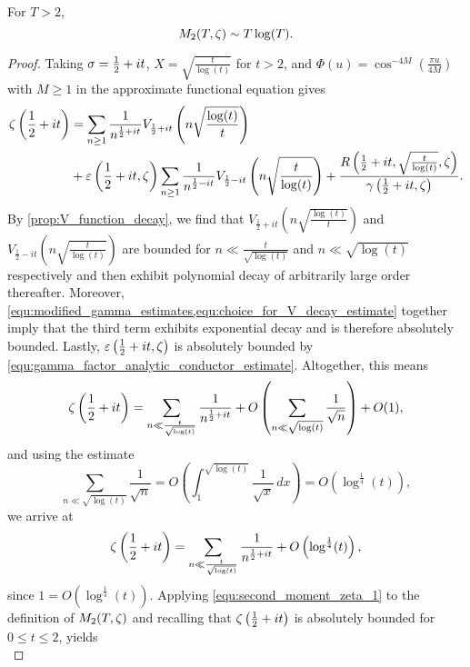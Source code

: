     \begin{theorem}
      For $T > 2$,
      \[
        M_{2}(T,\zeta) \sim T\log(T).
      \]
    \end{theorem}
    \begin{proof}
      Taking $\sigma = \frac{1}{2}+it$, $X = \sqrt{\frac{t}{\log(t)}}$ for $t > 2$, and $\Phi(u) = \cos^{-4M}\left(\frac{\pi u}{4M}\right)$ with $M \ge 1$ in the approximate functional equation gives
      \begin{align*}
        \zeta\left(\frac{1}{2}+it\right) &= \sum_{n \ge 1}\frac{1}{n^{\frac{1}{2}+it}}V_{\frac{1}{2}+it}\left(n\sqrt{\frac{\log(t)}{t}}\right) \\
        &+ \varepsilon\left(\frac{1}{2}+it,\zeta\right)\sum_{n \ge 1}\frac{1}{n^{\frac{1}{2}-it}}V_{\frac{1}{2}-it}\left(n\sqrt{\frac{t}{\log(t)}}\right)+\frac{R\left(\frac{1}{2}+it,\sqrt{\frac{t}{\log(t)}},\zeta\right)}{\gamma\left(\frac{1}{2}+it,\zeta\right)}.
      \end{align*}
      By \cref{prop:V_function_decay}, we find that $V_{\frac{1}{2}+it}\left(n\sqrt{\frac{\log(t)}{t}}\right)$ and $V_{\frac{1}{2}-it}\left(n\sqrt{\frac{t}{\log(t)}}\right)$ are bounded for $n \ll \frac{t}{\sqrt{\log(t)}}$ and $n \ll \sqrt{\log(t)}$ respectively and then exhibit polynomial decay of arbitrarily large order thereafter. Moreover, \cref{equ:modified_gamma_estimates,equ:choice_for_V_decay_estimate} together imply that the third term exhibits exponential decay and is therefore absolutely bounded. Lastly, $\varepsilon\left(\frac{1}{2}+it,\zeta\right)$ is absolutely bounded by \cref{equ:gamma_factor_analytic_conductor_estimate}. Altogether, this means
      \[
        \zeta\left(\frac{1}{2}+it\right) = \sum_{n \ll \frac{t}{\sqrt{\log(t)}}}\frac{1}{n^{\frac{1}{2}+it}}+O\left(\sum_{n \ll \sqrt{\log(t)}}\frac{1}{\sqrt{n}}\right)+O(1),
      \]
      and using the estimate
      \[
        \sum_{n \ll \sqrt{\log(t)}}\frac{1}{\sqrt{n}} = O\left(\int_{1}^{\sqrt{\log(t)}}\frac{1}{\sqrt{x}}\,dx\right) = O\left(\log^{\frac{1}{4}}(t)\right),
      \]
      we arrive at
      \begin{equation}\label{equ:second_moment_zeta_1}
        \zeta\left(\frac{1}{2}+it\right) = \sum_{n \ll \frac{t}{\sqrt{\log(t)}}}\frac{1}{n^{\frac{1}{2}+it}}+O\left(\log^{\frac{1}{4}}(t)\right),
      \end{equation}
      since $1 = O(\log^{\frac{1}{4}}(t))$. Applying \cref{equ:second_moment_zeta_1} to the definition of $M_{2}(T,\zeta)$ and recalling that $\zeta\left(\frac{1}{2}+it\right)$ is absolutely bounded for $0 \le t \le 2$, yields
      \begin{equation}\label{equ:second_moment_zeta_2}

\end{equation}
\end{proof}
